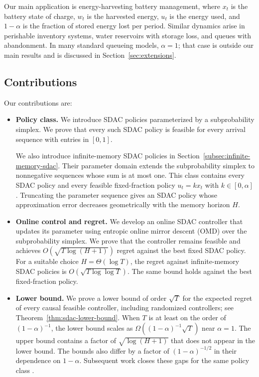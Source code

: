 \documentclass[journal]{IEEEtran}
\theoremstyle{remark}
\begin{document}
Our main application is energy-harvesting battery management, where $x_t$ is the
battery state of charge, $w_t$ is the harvested energy, $u_t$ is the energy
used, and $1-\alpha$ is the fraction of stored energy lost per period.
Similar dynamics arise in perishable inventory systems, water reservoirs with
storage loss, and queues with abandonment. In many standard queueing models,
$\alpha=1$; that case is outside our main results and is discussed in
Section~\ref{sec:extensions}.


\subsection{Contributions}

Our contributions are:
\begin{itemize}
\item \textbf{Policy class.}
    We introduce SDAC policies parameterized by a
    subprobability simplex. We prove that every such SDAC policy is feasible
    for every arrival sequence with entries in $[0,1]$.

    We also introduce infinite-memory SDAC policies in
    Section~\ref{subsec:infinite-memory-sdac}. Their parameter domain extends the
    subprobability simplex to nonnegative sequences whose sum is at most one.
    This class contains every SDAC policy and every feasible
    fixed-fraction policy $u_t=kx_t$ with $k\in[0,\alpha]$.
    Truncating the parameter sequence gives an SDAC policy whose
    approximation error decreases geometrically with the memory horizon $H$.

\item \textbf{Online control and regret.}
    We develop an online SDAC controller that updates its parameter using
    entropic online mirror descent (OMD) over the subprobability simplex.
    We prove that the controller remains feasible and achieves
    $O\!\left(\sqrt{T\log(H+1)}\right)$
    regret against the best fixed SDAC policy.
    For a suitable choice $H=\Theta(\log T)$, the regret against
    infinite-memory SDAC policies is
    $O\!\left(\sqrt{T\log\log T}\right)$. The same bound
    holds against the best fixed-fraction policy.

\item \textbf{Lower bound.}
    We prove a lower bound of order $\sqrt{T}$ for the expected regret of every
    causal feasible controller, including randomized controllers; see
    Theorem~\ref{thm:sdac-lower-bound}. When $T$ is at least on the order of
    $(1-\alpha)^{-1}$, the lower bound scales as
    $\Omega((1-\alpha)^{-1}\sqrt{T})$ near $\alpha=1$.
    The upper bound contains a factor of $\sqrt{\log(H+1)}$ that does not
    appear in the lower bound. The bounds also differ by a factor of
    $(1-\alpha)^{-1/2}$ in their dependence on $1-\alpha$.
    Subsequent work closes these gaps for the same policy class
    \cite{asgari2026cumulative}.
\end{itemize}
\end{document}
